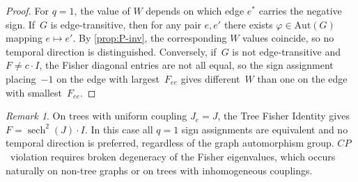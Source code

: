 \documentclass[11pt]{article}
\theoremstyle{definition}
\theoremstyle{remark}
\newtheorem{remark}[theorem]{Remark}
\begin{document}
\begin{proof}
For $q = 1$, the value of $W$ depends on which edge $e^*$ carries the
negative sign. If~$G$ is edge-transitive, then for any pair $e, e'$ there
exists $\varphi \in \mathrm{Aut}(G)$ mapping $e \mapsto e'$. By
\cref{prop:P-inv}, the corresponding $W$ values coincide, so no temporal
direction is distinguished. Conversely, if~$G$ is not edge-transitive and
$F \neq c \cdot I$, the Fisher diagonal entries are not all equal, so
the sign assignment placing~$-1$ on the edge with largest~$F_{ee}$ gives
different~$W$ than one on the edge with smallest~$F_{ee}$.
\end{proof}

\begin{remark}
On trees with uniform coupling $J_e = J$, the Tree Fisher Identity gives
$F = \operatorname{sech}^2(J) \cdot I$. In this case all $q = 1$ sign
assignments are equivalent and no temporal direction is preferred, regardless
of the graph automorphism group. $CP$~violation requires broken degeneracy
of the Fisher eigenvalues, which occurs naturally on non-tree graphs or on
trees with inhomogeneous couplings.
\end{remark}
\end{document}
